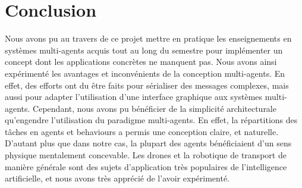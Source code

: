 \documentclass[11pt]{report}
\begin{document}
\newpage

\section{Conclusion}

Nous avons pu au travers de ce projet mettre en pratique les enseignements en systèmes multi-agents acquis tout au long du semestre pour implémenter un concept dont les applications concrètes ne manquent pas. Nous avons ainsi expérimenté les avantages et inconvénients de la conception multi-agents. En effet, des efforts ont du être faits pour sérialiser des messages complexes, mais aussi pour adapter l'utilisation d'une interface graphique aux systèmes multi-agents. Cependant, nous avons pu bénéficier de la simplicité architecturale qu'engendre l'utilisation du paradigme multi-agents. En effet, la répartitions des tâches en agents et behaviours a permis une conception claire, et naturelle. D'autant plus que dans notre cas, la plupart des agents bénéficiaient d'un sens physique mentalement concevable. Les drones et la robotique de transport de manière générale sont des sujets d'application très populaires de l'intelligence artificielle, et nous avons très apprécié de l'avoir expérimenté.
\end{document}
